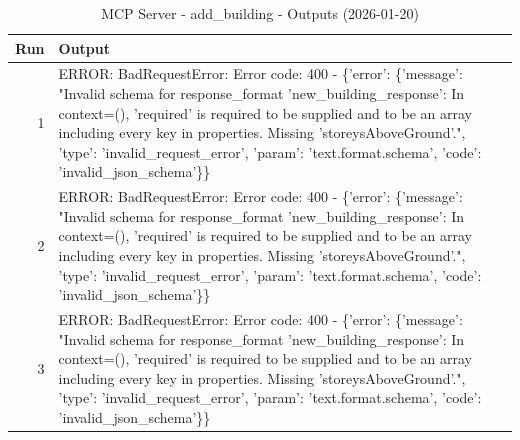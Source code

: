 \begin{table}[ht]
\centering
\small
\caption{MCP Server - add\_building - Outputs (2026-01-20)}
\label{tab:mcp\_add\_building\_outputs\_2026-01-20}
\begin{tabularx}{\linewidth}{r X}
\hline
Run & Output \\
\hline
1 & ERROR: BadRequestError: Error code: 400 - \{'error': \{'message': "Invalid schema for response\_format 'new\_building\_response': In context=(), 'required' is required to be supplied and to be an array including every key in properties. Missing 'storeysAboveGround'.", 'type': 'invalid\_request\_error', 'param': 'text.format.schema', 'code': 'invalid\_json\_schema'\}\} \\
2 & ERROR: BadRequestError: Error code: 400 - \{'error': \{'message': "Invalid schema for response\_format 'new\_building\_response': In context=(), 'required' is required to be supplied and to be an array including every key in properties. Missing 'storeysAboveGround'.", 'type': 'invalid\_request\_error', 'param': 'text.format.schema', 'code': 'invalid\_json\_schema'\}\} \\
3 & ERROR: BadRequestError: Error code: 400 - \{'error': \{'message': "Invalid schema for response\_format 'new\_building\_response': In context=(), 'required' is required to be supplied and to be an array including every key in properties. Missing 'storeysAboveGround'.", 'type': 'invalid\_request\_error', 'param': 'text.format.schema', 'code': 'invalid\_json\_schema'\}\} \\
\hline
\end{tabularx}
\end{table}
